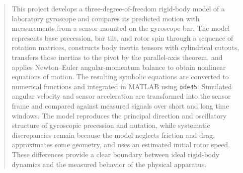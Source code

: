 \documentclass[11pt]{article}
\begin{document}
\hypersetup{pageanchor=false}

\clearpage
{}
\hypersetup{pageanchor=true}
\begin{abstract}
This project develops a three-degree-of-freedom rigid-body model of a laboratory gyroscope and compares its predicted motion with measurements from a sensor mounted on the gyroscope bar. The model represents base precession, bar tilt, and rotor spin through a sequence of rotation matrices, constructs body inertia tensors with cylindrical cutouts, transfers those inertias to the pivot by the parallel-axis theorem, and applies Newton--Euler angular-momentum balance to obtain nonlinear equations of motion. The resulting symbolic equations are converted to numerical functions and integrated in MATLAB using \texttt{ode45}. Simulated angular velocity and sensor acceleration are transformed into the sensor frame and compared against measured signals over short and long time windows. The model reproduces the principal direction and oscillatory structure of gyroscopic precession and nutation, while systematic discrepancies remain because the model neglects friction and drag, approximates some geometry, and uses an estimated initial rotor speed. These differences provide a clear boundary between ideal rigid-body dynamics and the measured behavior of the physical apparatus.
\end{abstract}
\end{document}
